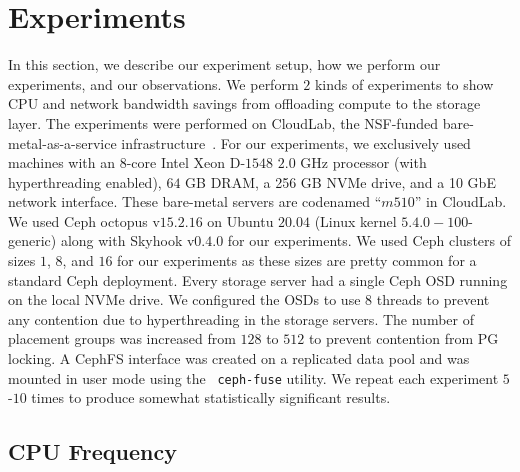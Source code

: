 \documentclass[11pt]{article}
\newcommand{\code}[1]{\colorbox{light-gray}{\texttt{#1}}}
\begin{document}
\section{Experiments}
\label{sec:experiments}
In this section, we describe our experiment setup, how we perform our experiments, and our observations. We perform $2$ kinds of experiments to show CPU and network bandwidth savings from offloading compute to the storage layer. The experiments were performed on CloudLab, the NSF-funded bare-metal-as-a-service infrastructure~\cite{cloudlab}. For our
experiments, we exclusively used machines with an 8-core
Intel Xeon D-$1548$ $2.0$ GHz processor (with hyperthreading
enabled), $64$ GB DRAM, a 256 GB NVMe drive, and a 10 GbE
network interface. These bare-metal servers are codenamed
“$m510$” in CloudLab. We used Ceph octopus v$15.2.16$ on Ubuntu $20.04$ (Linux kernel $5.4.0-100$-generic) along with Skyhook v$0.4.0$ for our experiments. We used Ceph clusters of sizes $1$, $8$, and $16$ for our experiments as these sizes are pretty common for a standard Ceph deployment. Every storage server had a single Ceph OSD running on the local NVMe drive. We configured the OSDs to use $8$ threads to prevent any contention due to hyperthreading in the storage servers. The number of placement groups was increased from $128$ to $512$ to prevent contention from PG locking. A CephFS interface was created on a replicated data pool and was mounted in user mode using the ~\code{ceph-fuse} utility. We repeat each experiment $5$-$10$ times to produce somewhat statistically significant results. 
\subsection{CPU Frequency}
\end{document}
